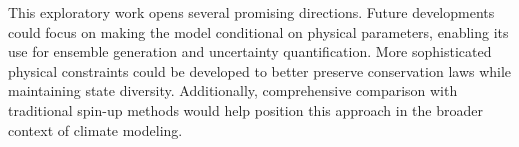 \documentclass{article}
\begin{document}
This exploratory work opens several promising directions. Future developments could focus on making the model conditional on physical parameters, enabling its use for ensemble generation and uncertainty quantification. More sophisticated physical constraints could be developed to better preserve conservation laws while maintaining state diversity. Additionally, comprehensive comparison with traditional spin-up methods would help position this approach in the broader context of climate modeling.





\appendix


\end{document}
